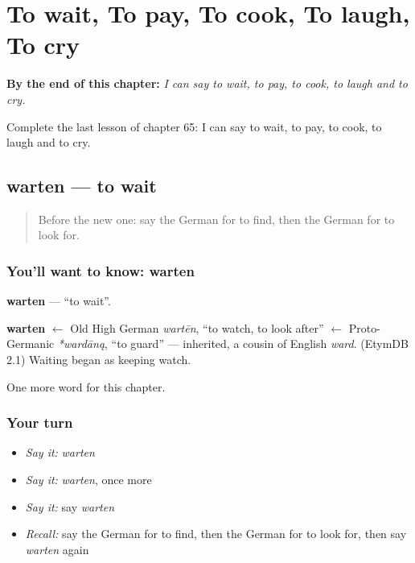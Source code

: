 
\chapter{To wait, To pay, To cook, To laugh, To cry}
\label{ch:ge-to-wait-to-pay-to-cook-to-laugh-to-cry}

\begin{chapteropening}
\textbf{By the end of this chapter:} \emph{I can say to wait, to pay, to cook, to laugh and to cry.}

Complete the last lesson of chapter 65: I can say to wait, to pay, to cook, to laugh and to cry.
\end{chapteropening}

\section[warten]{warten — to wait}

\label{lesson:GE-C65-warten}



\begin{quote}
Before the new one: say the German for to find, then the German for to look for.
\end{quote}

\subsection*{You'll want to know: warten}
\textbf{warten} — \textquotedblleft{}to wait\textquotedblright{}.

\begin{cousinweb}
\textbf{warten} $\leftarrow$ Old High German \emph{wartēn}, \textquotedblleft{}to watch, to look after\textquotedblright{} $\leftarrow$ Proto-Germanic \emph{*wardāną}, \textquotedblleft{}to guard\textquotedblright{} — inherited, a cousin of English \emph{ward}. (EtymDB 2.1) Waiting began as keeping watch.
\end{cousinweb}

\begin{grammarlens}[title={What you've built}]
One more word for this chapter.
\end{grammarlens}

\subsection*{Your turn}
\begin{itemize}
\raggedright
  \item \emph{Say it:} \emph{warten}
  \item \emph{Say it:} \emph{warten}, once more
  \item \emph{Say it:} say \emph{warten}
  \item \emph{Recall:} say the German for to find, then the German for to look for, then say \emph{warten} again
\end{itemize}

